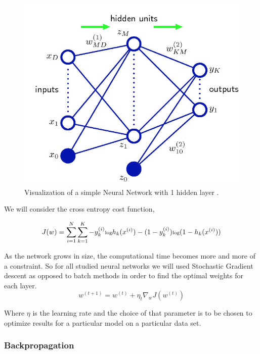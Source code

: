 \documentclass[12pt, twocolumn]{article}
\begin{document}
\begin{figure}
\includegraphics[scale=.6]{simpleNN.png}

\caption{Visualization of a simple Neural Network with 1 hidden layer \cite{Bishop} . }
\label{fig:basicNN}
\end{figure}


We will consider the cross entropy cost function, 

\begin{equation}
\scriptsize
J(w)= \sum_{i=1}^N \sum_{k=1}^K -y^{(i)}_k \textrm{log}h_k(x^{(i)})- (1 -y^{(i)}_k) \textrm{log}(1 -h_k(x^{(i)}))
\end {equation}



As the network grows in size, the computational time becomes more and more of a constraint. So for all studied neural networks we will used Stochastic Gradient descent as opposed to batch methods in order to find the optimal weights for each layer. 
\begin{equation}
w^{(t+1)} = w^{(t)} + \eta_t \nabla_w J(w^{(t)})
\end{equation}

Where $\eta$ is  the learning rate and the choice of that parameter is to be chosen to optimize results for a particular model on a particular data set.


\subsubsection{Backpropagation}
\end{document}
